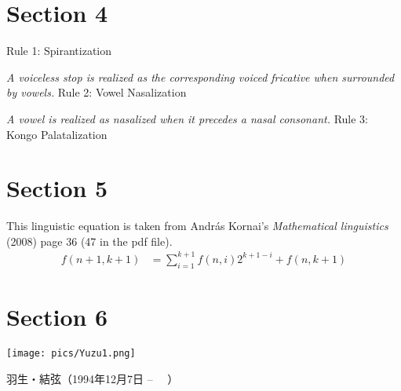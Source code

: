 \documentclass{article}
\begin{document}
\section{Section 4}

Rule 1: Spirantization
\newline
\newline
{}
\newline\newline

\textit{A voiceless stop is realized as the corresponding voiced fricative when
surrounded by vowels.}
\newline
\newline
Rule 2: Vowel Nasalization
\newline

\newline
\newline
\textit{A vowel is realized as nasalized when it precedes a nasal consonant.}
\newline
\newline
Rule 3: Kongo Palatalization
\newline


\section{Section 5}
This linguistic equation is taken from András Kornai's \textit{Mathematical linguistics} (2008) page 36 (47 in the pdf file).
\newline
{}
\begin{align*}
f(n+1,k+1) &= \sum_{i=1}^{k+1} f(n,i)2^{k+1-i} + f(n,k+1)
\end{align*}

\section{Section 6}
\texttt{[image: pics/Yuzu1.png]}
\begin{CJK}{UTF8}{min}
羽生・結弦（1994年12月7日 -- 　）
\end{CJK} 
\newline
\end{document}
